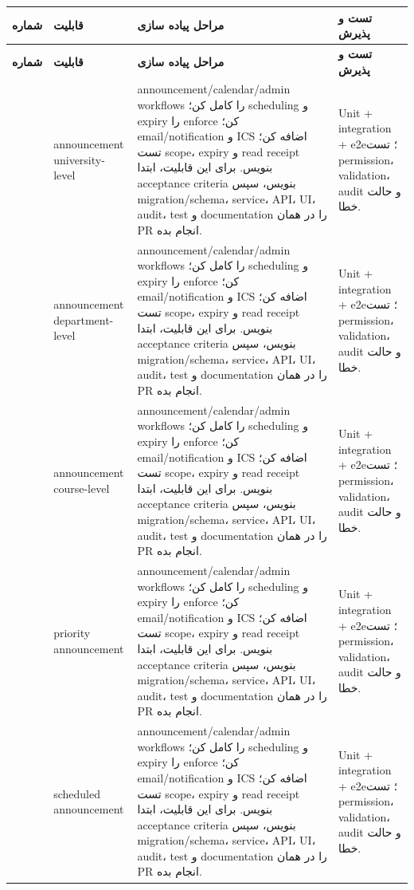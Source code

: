 \documentclass[11pt,a4paper]{article}
\begin{document}
\begin{longtable}{|>{\raggedleft\arraybackslash}p{}|>{\raggedleft\arraybackslash}p{}|>{\raggedleft\arraybackslash}p{}|>{\raggedleft\arraybackslash}p{}|}
\hline
\textbf{شماره} & \textbf{قابلیت} & \textbf{مراحل پیاده سازی} & \textbf{تست و پذیرش} \\\hline
\endfirsthead
\hline
\textbf{شماره} & \textbf{قابلیت} & \textbf{مراحل پیاده سازی} & \textbf{تست و پذیرش} \\\hline
\endhead
281 & announcement university-level & announcement/calendar/admin workflows را کامل کن؛ scheduling و expiry را enforce کن؛ email/notification و ICS اضافه کن؛ تست scope، expiry و read receipt بنویس. برای این قابلیت، ابتدا acceptance criteria بنویس، سپس migration/schema، service، API، UI، audit، test و documentation را در همان PR انجام بده. & Unit + integration + e2e؛ تست permission، validation، audit و حالت خطا. \\ \hline
282 & announcement department-level & announcement/calendar/admin workflows را کامل کن؛ scheduling و expiry را enforce کن؛ email/notification و ICS اضافه کن؛ تست scope، expiry و read receipt بنویس. برای این قابلیت، ابتدا acceptance criteria بنویس، سپس migration/schema، service، API، UI، audit، test و documentation را در همان PR انجام بده. & Unit + integration + e2e؛ تست permission، validation، audit و حالت خطا. \\ \hline
283 & announcement course-level & announcement/calendar/admin workflows را کامل کن؛ scheduling و expiry را enforce کن؛ email/notification و ICS اضافه کن؛ تست scope، expiry و read receipt بنویس. برای این قابلیت، ابتدا acceptance criteria بنویس، سپس migration/schema، service، API، UI، audit، test و documentation را در همان PR انجام بده. & Unit + integration + e2e؛ تست permission، validation، audit و حالت خطا. \\ \hline
284 & priority announcement & announcement/calendar/admin workflows را کامل کن؛ scheduling و expiry را enforce کن؛ email/notification و ICS اضافه کن؛ تست scope، expiry و read receipt بنویس. برای این قابلیت، ابتدا acceptance criteria بنویس، سپس migration/schema، service، API، UI، audit، test و documentation را در همان PR انجام بده. & Unit + integration + e2e؛ تست permission، validation، audit و حالت خطا. \\ \hline
285 & scheduled announcement & announcement/calendar/admin workflows را کامل کن؛ scheduling و expiry را enforce کن؛ email/notification و ICS اضافه کن؛ تست scope، expiry و read receipt بنویس. برای این قابلیت، ابتدا acceptance criteria بنویس، سپس migration/schema، service، API، UI، audit، test و documentation را در همان PR انجام بده. & Unit + integration + e2e؛ تست permission، validation، audit و حالت خطا. \\ \hline

\end{longtable}
\end{document}

